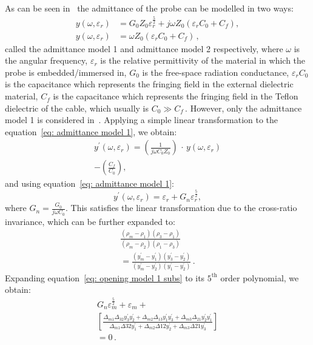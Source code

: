 \documentclass[12pt, a4paper]{article}
\begin{document}
\begin{multicols*}{2}
As can be seen in~\cite{marsland1987dielectric} the admittance of the probe can be modelled in two ways:
\begin{align}
    y(\omega, \varepsilon_r) &= G_0 Z_0 \varepsilon_r^{\frac{5}{2}} + j \omega Z_0(\varepsilon_r C_0 + C_f) ,  \label{eq: admittance model 1} \\
    y(\omega, \varepsilon_r) &= \omega Z_0(\varepsilon_r C_0 + C_f)\,, \label{eq: admittance model 2}
\end{align}
called the admittance model 1 and admittance model 2 respectively, where \(\omega\) is the angular frequency, \(\varepsilon_r\) is the relative permittivity of the material in which the probe is embedded/immersed in, \(G_0\) is the free-space radiation conductance, \(\varepsilon_r C_0\) is the capacitance which represents the fringing field in the external dielectric material, \(C_f\) is the capacitance which represents the fringing field in the Teflon dielectric of the cable, which usually is \(C_0 \gg C_f\)\,. However, only the admittance model 1 is considered in~\cite{marsland1987dielectric}. Applying a simple linear transformation to the equation~\ref{eq: admittance model 1}, we obtain:
\begin{multline}
    y^{\prime}(\omega, \varepsilon_r) = \left(\frac{1}{j \omega C_0 Z_0}\right)\, \cdot \,y(\omega , \varepsilon_r) \\- \left(\frac{C_f}{C_0}\right) , \label{eq: admittance model 1 transformed}
\end{multline}
and using equation~\ref{eq: admittance model 1}:
\begin{equation}
    y^{\prime}(\omega, \varepsilon_r) = \varepsilon_r + G_n \varepsilon_r^\frac{5}{2} , \label{eq: admittance model 1 substitution}
\end{equation}
where \(G_n = \frac{G_0}{j\omega C_0}\). This satisfies the linear transformation due to the cross-ratio invariance, which can be further expanded to:
\begin{multline}
    \frac{(\rho_m - \rho_1)(\rho_3 - \rho_1)}{(\rho_m - \rho_2)(\rho_1 - \rho_3)} \\= \frac{(y^{\prime}_m - y^{\prime}_1)(y^{\prime}_3 - y^{\prime}_2)}{(y^{\prime}_m - y^{\prime}_2)(y^{\prime}_1 - y^{\prime}_2)}\,. \label{eq: opening model 1 subs}
\end{multline}
Expanding equation~\ref{eq: opening model 1 subs} to its \(5^{\text{th}}\) order polynomial, we obtain:
\begin{multline}
    G_n \varepsilon_m^{\frac{5}{2}} + \varepsilon_m + \\\left[\frac{\Delta_{m1} \Delta_{32} y^{\prime}_3 y^{\prime}_2 + \Delta_{m2} \Delta_{13} y^{\prime}_1 y^{\prime}_3 + \Delta_{m3} \Delta_{21} y^{\prime}_2 y^{\prime}_1}{\Delta_{m1} \Delta{32} y^{\prime}_1 + \Delta_{m2} \Delta{12} y^{\prime}_2 + \Delta_{m3} \Delta{21} y^{\prime}_3}\right]\\ = 0\,. \label{eq: big substitution}

\end{multline}
\end{multicols*}
\end{document}

